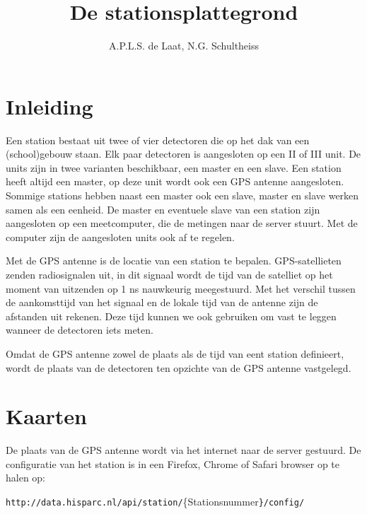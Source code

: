 

\title{De stationsplattegrond}
\author{A.P.L.S. de Laat, N.G. Schultheiss}



\maketitle

\section{Inleiding}

Een \hisparc station bestaat uit twee of vier detectoren die op het dak
van een (school)gebouw staan. Elk paar detectoren is aangesloten op een
\hisparc II of \hisparc III unit. De \hisparc units zijn in twee
varianten beschikbaar, een master en een slave. Een \hisparc station
heeft altijd een \hisparc master, op deze unit wordt ook een GPS antenne
aangesloten. Sommige stations hebben naast een master ook een slave,
master en slave werken samen als een eenheid. De master en eventuele
slave van een station zijn aangesloten op een meetcomputer, die de
metingen naar de \hisparc server stuurt. Met de computer zijn de
aangesloten units ook af te regelen.

Met de GPS antenne is de locatie van een station te bepalen.
GPS-satellieten zenden radiosignalen uit, in dit signaal wordt de tijd
van de satelliet op het moment van uitzenden op 1 ns nauwkeurig meegestuurd.
Met het verschil tussen de aankomsttijd van het signaal en de lokale
tijd van de antenne zijn de afstanden uit rekenen. Deze tijd kunnen we
ook gebruiken om  vast te leggen wanneer de detectoren iets meten. 

Omdat de GPS antenne zowel de plaats als de tijd van eent station definieert,
wordt de plaats van de detectoren ten opzichte van de GPS antenne
vastgelegd.


\section{Kaarten}

De plaats van de GPS antenne wordt via het internet naar de \hisparc
server gestuurd. De configuratie van het station is in een Firefox,
Chrome of Safari browser op te halen op: 

\texttt{\small{http://data.hisparc.nl/api/station/}}{\small{\{Stationsnummer}}\texttt{\small{\}/config/}}{\small \par}

